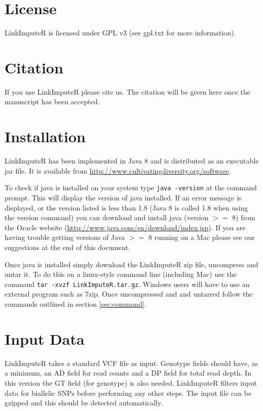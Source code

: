\documentclass[10pt]{report}
\begin{document}
\section{License}

LinkImputeR is licensed under GPL v3 (see gpl.txt for more information).

\section{Citation}

If you use LinkImputeR please cite us.  The citation will be given here once the manuscript has been accepted.


\section{Installation}

LinkImputeR has been implemented in Java 8 and is distributed as an executable jar file.  It is available from \url{http://www.cultivatingdiversity.org/software}.

To check if java is installed on your system type \texttt{java -version} at the command prompt.  This will display the version of java installed.  If an error message is displayed, or the version listed is less than 1.8 (Java 8 is called 1.8 when using the version command) you can download and install java (version $>=$ 8) from the Oracle website (\url{http://www.java.com/en/download/index.jsp}).  If you are having trouble getting versions of Java $>=$ 8 running on a Mac please see our suggestions at the end of this document.

Once java is installed simply download the LinkImputeR zip file, uncompress and untar it.  To do this on a linux-style command line (including Mac) use the command \texttt{tar -xvzf LinkImputeR.tar.gz}.  Windows users will have to use an external program such as 7zip.  Once uncompressed and and untarred follow the commands outlined in section \ref{sec:command}.

\section{Input Data}

LinkImputeR takes a standard VCF file as input.  Genotype fields should have, as a minimum, an AD field for read counts and a DP field for total read depth.  In this version the GT field (for genotype) is also needed.  LinkImputeR filters input data for biallelic SNPs before performing any other steps.  The input file can be gzipped and this should be detected automatically.
\end{document}
